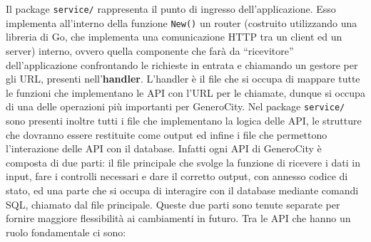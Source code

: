 \documentclass[italian, Lau, oneside, nodefaultfont, noexaminfo]{sapthesis}
\begin{document}
Il package \texttt{service/} rappresenta il punto di ingresso dell'applicazione. 
Esso implementa all'interno della funzione \texttt{New()} un router (costruito utilizzando una libreria di Go, che implementa una comunicazione HTTP tra un client ed un server) interno, ovvero quella componente che farà da ``ricevitore'' dell'applicazione confrontando le richieste in entrata e chiamando un gestore per gli URL, presenti nell'\textbf{handler}. L'handler è il file che si occupa di mappare tutte le funzioni che implementano le API con l'URL per le chiamate, dunque si occupa di una delle operazioni più importanti per GeneroCity. 
Nel package \texttt{service/} sono presenti inoltre tutti i file che implementano la logica delle API, le strutture che dovranno essere restituite come output ed infine i file che permettono l'interazione delle API con il database. Infatti ogni API di GeneroCity è composta di due parti: il file principale che svolge la funzione di ricevere i dati in input, fare i controlli necessari e dare il corretto output, con annesso codice di stato, ed una parte che si occupa di interagire con il database mediante comandi SQL, chiamato dal file principale. Queste due parti sono tenute separate per fornire maggiore flessibilità ai cambiamenti in futuro. Tra le API che hanno un ruolo fondamentale ci sono:
\end{document}
